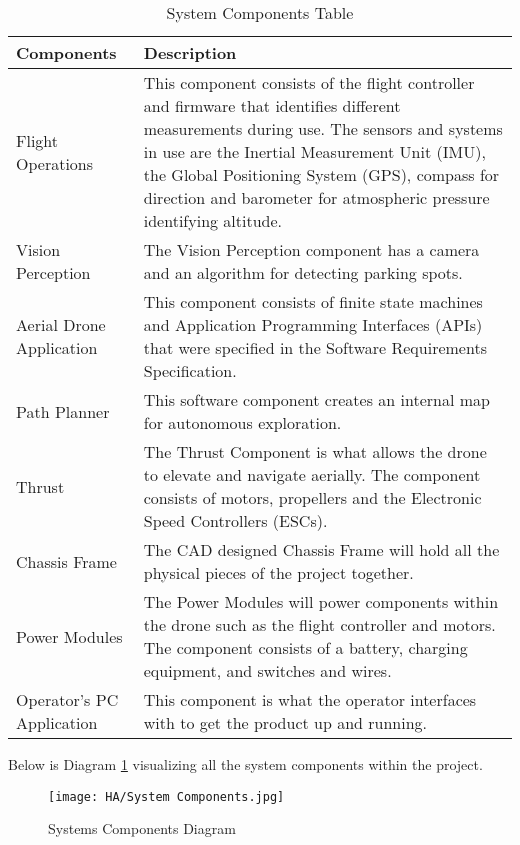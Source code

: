 \documentclass{article}
\begin{document}
\begin{table}[!h]
\begin{center}
\caption {System Components Table} 
\label{tab:SystemComp}
\begin{tabular}{ | m{4 cm} | m{12 cm} | } 
\hline
Components & Description \\
\hline
Flight Operations & This component consists of the flight controller and firmware that identifies different measurements during use. The sensors and systems in use are the Inertial Measurement Unit (IMU), the Global Positioning System (GPS), compass for direction and barometer for atmospheric pressure identifying altitude.\\
\hline
Vision Perception & The Vision Perception component has a camera and an algorithm for detecting parking spots.\\
\hline
Aerial Drone Application & This component consists of finite state machines and Application Programming Interfaces (APIs) that were specified in the Software Requirements Specification.\\
\hline
Path Planner & This software component creates an internal map for autonomous exploration.\\
\hline
Thrust & The Thrust Component is what allows the drone to elevate and navigate aerially. The component consists of motors, propellers and  the Electronic Speed Controllers (ESCs).\\
\hline
Chassis Frame & The CAD designed Chassis Frame will hold all the physical pieces of the project together.\\
\hline
Power Modules & The Power Modules will power components within the drone such as the flight controller and motors. The component consists of a battery, charging equipment, and switches and wires.\\
\hline
Operator's PC Application & This component is what the operator interfaces with to get the product up and running.\\
\hline

\end{tabular}
\end{center}
\end{table}


Below is  Diagram \ref{fig:SystemCompDiagram} visualizing all the system components within the project. 


\begin{figure}[!h]
    \centering
    \texttt{[image: HA/System Components.jpg]}
    \caption{Systems Components Diagram}
    \label{fig:SystemCompDiagram}
\end{figure}
\end{document}
